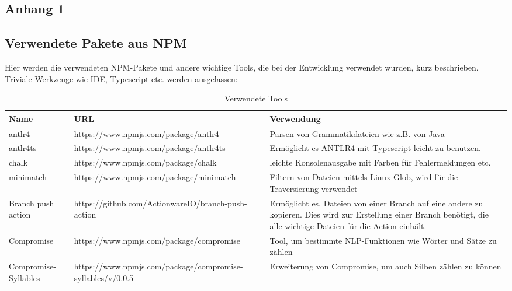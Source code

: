 
\renewcommand\appendixpagename{Anhänge}
\begin{appendices}


\chapter{Anhang 1}
\section{Verwendete Pakete aus NPM}
Hier werden die verwendeten NPM-Pakete und andere wichtige Tools, die bei der Entwicklung verwendet wurden, kurz beschrieben. Triviale Werkzeuge wie IDE, Typescript etc. werden ausgelassen:
\begin{table}[h]
    \begin{tabular}{m{2.3cm}|m{8.5cm}|m{6.0cm}}
       Name  & URL & Verwendung  \\
       \hline
        antlr4 & https://www.npmjs.com/package/antlr4 & Parsen von Grammatikdateien wie z.B. von Java\\
        \hline
        antlr4ts & https://www.npmjs.com/package/antlr4ts & Ermöglicht es ANTLR4 mit Typescript leicht zu benutzen. \\\hline
        chalk & https://www.npmjs.com/package/chalk & leichte Konsolenausgabe mit Farben für Fehlermeldungen etc. \\\hline
        minimatch & https://www.npmjs.com/package/minimatch & Filtern von Dateien mittels  Linux-Glob, wird für die Traversierung verwendet\\\hline
        Branch push action & https://github.com/ActionwareIO/branch-push-action & Ermöglicht es, Dateien von einer Branch auf eine andere zu kopieren. Dies wird zur Erstellung einer Branch benötigt, die alle wichtige Dateien für die Action einhält.\\\hline
        Compromise & https://www.npmjs.com/package/compromise & Tool, um bestimmte NLP-Funktionen wie Wörter und Sätze zu zählen\\\hline
        Compromise-Syllables & https://www.npmjs.com/package/compromise-syllables/v/0.0.5 & Erweiterung von Compromise, um auch Silben zählen zu können
    \end{tabular}
    \caption{Verwendete Tools}
    \label{tab:used_tools}
\end{table}

\end{appendices}
	
